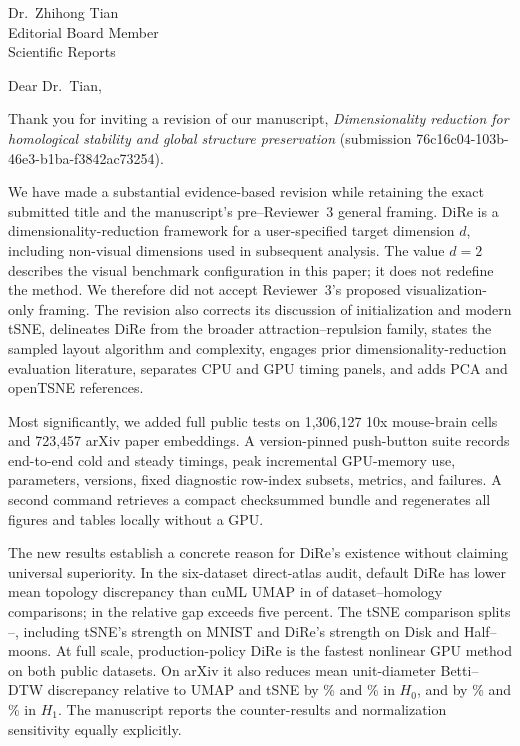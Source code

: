 \documentclass[10pt]{letter}
\begin{document}
\begin{letter}{Dr.\ Zhihong Tian\\Editorial Board Member\\Scientific Reports}

\opening{Dear Dr.\ Tian,}

Thank you for inviting a revision of our manuscript,
\emph{Dimensionality reduction for homological stability and global structure
preservation}
(submission 76c16c04-103b-46e3-b1ba-f3842ac73254).

We have made a substantial evidence-based revision while retaining the exact
submitted title and the manuscript's pre--Reviewer~3 general framing. DiRe is a
dimensionality-reduction framework for a user-specified target dimension $d$,
including non-visual dimensions used in subsequent analysis. The value $d=2$
describes the visual benchmark configuration in this paper; it does not
redefine the method. We therefore did not accept Reviewer~3's proposed
visualization-only framing. The revision also corrects its discussion of
initialization and modern tSNE, delineates DiRe from the broader
attraction--repulsion family, states the sampled layout algorithm and
complexity, engages prior dimensionality-reduction evaluation literature,
separates CPU and GPU timing panels, and adds PCA and openTSNE references.

Most significantly, we added full public tests on 1,306,127 10x mouse-brain
cells and 723,457 arXiv paper embeddings. A version-pinned push-button suite
records end-to-end cold and steady timings, peak incremental GPU-memory use,
parameters, versions, fixed diagnostic row-index subsets, metrics, and
failures. A second command
retrieves a compact checksummed bundle and regenerates all figures and tables
locally without a GPU.

The new results establish a concrete reason for DiRe's existence without
claiming universal superiority. In the six-dataset direct-atlas audit, default
DiRe has lower mean topology discrepancy than cuML UMAP in
\SmallAtlasDireLowerVsUmapCount{} of
\SmallAtlasUmapComparisonCount{} dataset--homology comparisons; in
\SmallAtlasDireFivePctLowerVsUmapCount{} the relative gap exceeds five
percent. The tSNE comparison splits
\SmallAtlasDireLowerVsTsneCount{}--\SmallAtlasTsneLowerVsDireCount{},
including tSNE's strength on MNIST and DiRe's strength on Disk and
Half--moons. At full scale, production-policy DiRe is the fastest nonlinear
GPU method on both public datasets. On arXiv it also reduces mean
unit-diameter Betti--DTW discrepancy relative to UMAP and tSNE by
\ArxivDireBetaZeroDtwReductionVsUmapPct\% and
\ArxivDireBetaZeroDtwReductionVsTsnePct\% in $H_0$, and by
\ArxivDireBetaOneDtwReductionVsUmapPct\% and
\ArxivDireBetaOneDtwReductionVsTsnePct\% in $H_1$. The manuscript reports the
counter-results and normalization sensitivity equally explicitly.


\end{letter}
\end{document}
